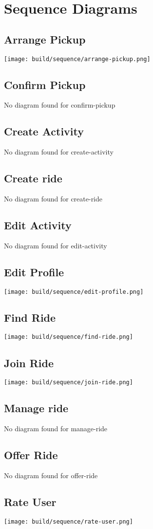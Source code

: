\documentclass[11pt]{article}
\begin{document}
\section{Sequence Diagrams}
\subsection{Arrange Pickup}
\texttt{[image: build/sequence/arrange-pickup.png]}
\subsection{Confirm Pickup}
No diagram found for confirm-pickup
\subsection{Create Activity}
No diagram found for create-activity
\subsection{Create ride}
No diagram found for create-ride
\subsection{Edit Activity}
No diagram found for edit-activity
\subsection{Edit Profile}
\texttt{[image: build/sequence/edit-profile.png]}
\subsection{Find Ride}
\texttt{[image: build/sequence/find-ride.png]}
\subsection{Join Ride}
\texttt{[image: build/sequence/join-ride.png]}
\subsection{Manage ride}
No diagram found for manage-ride
\subsection{Offer Ride}
No diagram found for offer-ride
\subsection{Rate User}
\texttt{[image: build/sequence/rate-user.png]}
\end{document}
